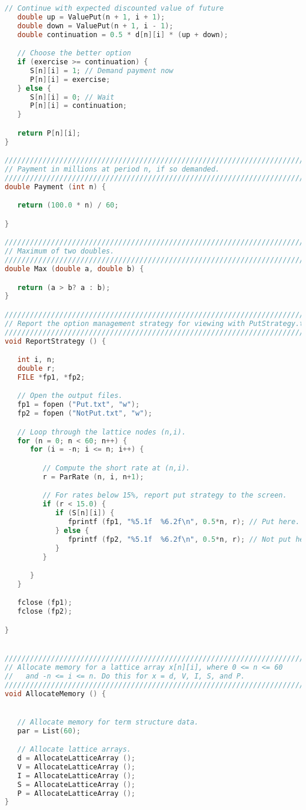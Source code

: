 \documentclass{report}
\begin{document}
\begin{lstlisting}[language=C++]
   // Continue with expected discounted value of future
   double up = ValuePut(n + 1, i + 1);
   double down = ValuePut(n + 1, i - 1);
   double continuation = 0.5 * d[n][i] * (up + down);

   // Choose the better option
   if (exercise >= continuation) {
      S[n][i] = 1; // Demand payment now
      P[n][i] = exercise;
   } else {
      S[n][i] = 0; // Wait
      P[n][i] = continuation;
   }

   return P[n][i];
}

////////////////////////////////////////////////////////////////////////////////
// Payment in millions at period n, if so demanded.
////////////////////////////////////////////////////////////////////////////////
double Payment (int n) {

   return (100.0 * n) / 60;

}

////////////////////////////////////////////////////////////////////////////////
// Maximum of two doubles.
////////////////////////////////////////////////////////////////////////////////
double Max (double a, double b) {

   return (a > b? a : b);
}

////////////////////////////////////////////////////////////////////////////////
// Report the option management strategy for viewing with PutStrategy.tex.
////////////////////////////////////////////////////////////////////////////////
void ReportStrategy () {

   int i, n;
   double r;
   FILE *fp1, *fp2;

   // Open the output files.
   fp1 = fopen ("Put.txt", "w");
   fp2 = fopen ("NotPut.txt", "w");

   // Loop through the lattice nodes (n,i).
   for (n = 0; n < 60; n++) {
      for (i = -n; i <= n; i++) {

         // Compute the short rate at (n,i).
         r = ParRate (n, i, n+1);

         // For rates below 15%, report put strategy to the screen.
         if (r < 15.0) {
            if (S[n][i]) {
               fprintf (fp1, "%5.1f  %6.2f\n", 0.5*n, r); // Put here.
            } else {
               fprintf (fp2, "%5.1f  %6.2f\n", 0.5*n, r); // Not put here.
            }
         }

      }
   }

   fclose (fp1);
   fclose (fp2);

}


////////////////////////////////////////////////////////////////////////////////
// Allocate memory for a lattice array x[n][i], where 0 <= n <= 60
//   and -n <= i <= n. Do this for x = d, V, I, S, and P.
////////////////////////////////////////////////////////////////////////////////
void AllocateMemory () {


   // Allocate memory for term structure data.
   par = List(60);

   // Allocate lattice arrays.
   d = AllocateLatticeArray ();
   V = AllocateLatticeArray ();
   I = AllocateLatticeArray ();
   S = AllocateLatticeArray ();
   P = AllocateLatticeArray ();
}
\end{lstlisting}
\end{document}
